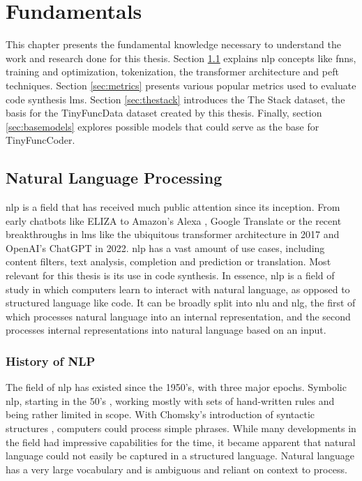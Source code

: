 \chapter{Fundamentals}
\label{chap:nlp}

This chapter presents the fundamental knowledge necessary to understand the work and research done for this thesis.
Section \ref{sec:nlp} explains \ac{nlp} concepts like \acp{fnn}, training and optimization, tokenization, the transformer architecture and \ac{peft} techniques.
Section \ref{sec:metrics} presents various popular metrics used to evaluate code synthesis \acp{lm}.
Section \ref{sec:thestack} introduces the The Stack dataset, the basis for the TinyFuncData dataset created by this thesis.
Finally, section \ref{sec:basemodels} explores possible models that could serve as the base for TinyFuncCoder.

\section{Natural Language Processing}
\label{sec:nlp}
\Ac{nlp} is a field that has received much public attention since its inception.
From early chatbots like ELIZA \cite{Weizenbaum.1966} to Amazon's Alexa \cite{Kumar.2017}, Google Translate \cite{Wu.2016} or the recent breakthroughs in \acp{lm} like the ubiquitous transformer architecture \cite{Vaswani.2017} in 2017 and OpenAI's ChatGPT \cite{OpenAI.2022,AlecRadfordKarthikNarasimhanTimSalimansIlyaSutskever.2018,Brown.2020} in 2022.
\ac{nlp} has a vast amount of use cases, including content filters, text analysis, completion and prediction or translation.
Most relevant for this thesis is its use in code synthesis.
In essence, \ac{nlp} is a field of study in which computers learn to interact with natural language, as opposed to structured language like code.
It can be broadly split into \ac{nlu} and \ac{nlg}, the first of which processes natural language into an internal representation, and the second processes internal representations into natural language based on an input.

\subsection{History of NLP}
\label{sec:history}
The field of \ac{nlp} has existed since the 1950's, with three major epochs.
Symbolic \ac{nlp}, starting in the 50's \cite{Nadkarni.2011,Johri.2021}, working mostly with sets of hand-written rules and being rather limited in scope.
With Chomsky's introduction of syntactic structures \cite{Lees.1957}, computers could process simple phrases.
While many developments in the field had impressive capabilities for the time, it became apparent that natural language could not easily be captured in a structured language.
Natural language has a very large vocabulary and is ambiguous and reliant on context to process.

